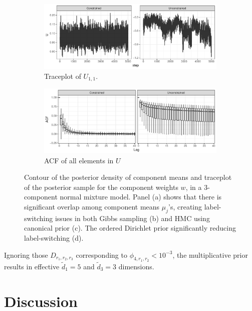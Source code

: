 \documentclass[10pt]{article}
\DeclareMathOperator{\1}{\mathbbm{1}}
\begin{document}
\begin{figure}[H]
   \begin{subfigure}[b]{1\textwidth}
    \includegraphics[width=1\textwidth]{tucker_traceplot.pdf}
    \caption{Traceplot of $U_{1,1}$.}
    \end{subfigure}
    \begin{subfigure}[b]{1\textwidth}
    \includegraphics[width=1\textwidth]{tucker_acf.pdf}
    \caption{ACF of all elements in $U$}
    \end{subfigure}
\caption{Contour of the posterior density of component means and traceplot of the posterior sample for the component weights $w$, in a 3-component normal mixture model. Panel (a) shows that there is significant overlap among component means $\mu_j$'s, creating label-switching issues in both Gibbs sampling (b) and HMC using canonical prior (c). The ordered Dirichlet prior significantly reducing label-switching (d).}
\label{tucker}
\end{figure}

Ignoring those $D_{r_1,r_2,r_3}$ corresponding to $\phi_{4,r_1,r_2}<10^{-3}$, the multiplicative prior results in effective $\tilde{d}_1=5$ and $\tilde{d}_3=3$ dimensions.

\section{Discussion}





\end{document}
